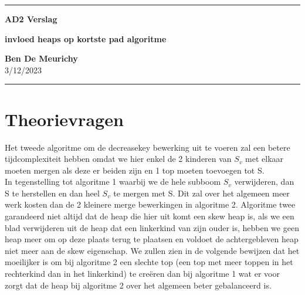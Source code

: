 \documentclass[10pt,a4paper,twoside]{article}
\begin{document}
\begin{center}
\hrule

\vspace{.4cm}
{\bf {\Huge AD2 Verslag}}
\vspace{.2cm}
\end{center}
\begin{center}
{\bf{\Large invloed heaps op kortste pad algoritme}}
\end{center}
{\bf Ben De Meurichy}  \\
\hspace{\fill} 3/12/2023 \\
\hrule


\section{ Theorievragen}
Het tweede algoritme om de decreasekey bewerking uit te voeren zal een betere tijdcomplexiteit hebben omdat we hier enkel de 2 kinderen van $S_v$ met elkaar moeten mergen als deze er beiden zijn en 1 top moeten toevoegen tot S.\\
In tegenstelling tot algoritme 1 waarbij we de hele subboom $S_v$ verwijderen, dan S te herstellen en dan heel $S_v$ te mergen met S. Dit zal over het algemeen meer werk kosten dan de 2 kleinere merge bewerkingen in algoritme 2.
Algoritme twee garandeerd niet altijd dat de heap die hier uit komt een skew heap is, als we een blad verwijderen uit de heap dat een linkerkind van zijn ouder is, hebben we geen heap meer om op deze plaats terug te plaatsen en voldoet de achtergebleven heap niet meer aan de skew eigenschap. We zullen zien in de volgende bewijzen dat het moeilijker is om bij algoritme 2 een slechte top (een top met meer toppen in het rechterkind dan in het linkerkind) te creëren dan bij algoritme 1 wat er voor zorgt dat de heap bij algoritme 2 over het algemeen beter gebalanceerd is.
\end{document}
